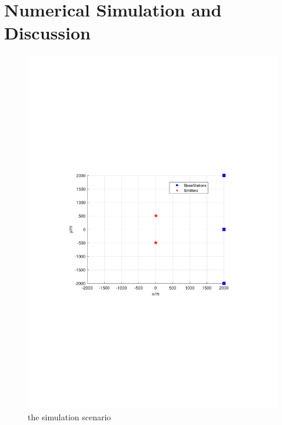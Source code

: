 \documentclass[review]{elsarticle}
\begin{document}
\section{Numerical Simulation and Discussion}
\begin{figure}[!t]
    \centerline{\includegraphics[width=1\textwidth]{pdfFigures/Senario.pdf}}
    \centering
	\caption{the simulation scenario}\label{fig3}
\end{figure}
\end{document}
